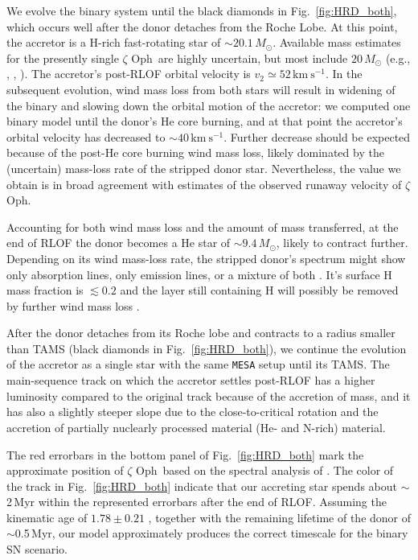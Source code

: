 \documentclass[twocolumn,twocolappendix,trackchanges]{aastex63}
\newcommand{\kms}{{\mathrm{km\ s^{-1}}}}
\DeclareRobustCommand{\Figref}[1]{Fig.~\ref{#1}}
\newcommand{\zoph}{$\zeta$ Oph}
\begin{document}
We evolve the binary system until the black diamonds in
\Figref{fig:HRD_both}, which occurs well after the donor detaches from
the Roche Lobe. At this point, the accretor is a H-rich fast-rotating
star of
$\sim$$20.1\,M_\odot$. Available mass estimates for the presently single \zoph\ are highly uncertain, but most include
$20\,M_\odot$ (e.g., \citealt{hoogerwerf:01}, , \citealt{neuhauser:20}). The accretor's post-RLOF orbital velocity is
$v_2\simeq52\,\kms$. In the subsequent evolution, wind mass loss from both stars will result in  widening of the binary and slowing down the orbital motion of the accretor: we computed one binary model until the donor's He core burning, and at that point the accretor's orbital velocity has decreased to
$\sim$$40\,\kms$. Further decrease should be expected because of the
post-He core burning wind mass loss, likely dominated by the
(uncertain) mass-loss rate of the stripped donor star. Nevertheless,
the value we obtain is in broad agreement with estimates of the
observed runaway velocity of \zoph.

Accounting for both wind mass loss and the amount of mass transferred,
at the end of RLOF the donor becomes a He star of
$\sim$$9.4\,M_\odot$, likely to contract further. Depending on its wind mass-loss rate, the stripped donor's spectrum might show only absorption lines, only emission lines, or a mixture of both \citep[e.g.,][]{crowther:07, neugent:17, gotberg:18}. It's surface H mass fraction is $\lesssim
0.2$ and the layer still containing H will possibly be removed by further wind mass loss \citep[e.g.,][]{gotberg:17}.

After the donor detaches from its Roche lobe and contracts to a radius smaller than TAMS (black diamonds in \Figref{fig:HRD_both}), we continue the evolution of the accretor as a single star with the same \texttt{MESA} setup until its TAMS. The main-sequence track on which the accretor settles post-RLOF has a higher luminosity compared to the original track because of the accretion of mass, and it has also a slightly steeper slope due to the close-to-critical rotation and the accretion of partially nuclearly processed material (He- and N-rich) material.

The red errorbars in the bottom panel of \Figref{fig:HRD_both} mark
the approximate position of \zoph\ based on the spectral analysis of
. The color of the track in
\Figref{fig:HRD_both} indicate that our accreting star spends about
$\sim$2\,Myr within the represented errorbars after the end of
RLOF. Assuming the kinematic age of $1.78\pm0.21$
\citep{neuhauser:20}, together with the remaining lifetime of the
donor of $\sim$0.5\,Myr, our model approximately produces the correct
timescale for the binary SN scenario.
\end{document}
